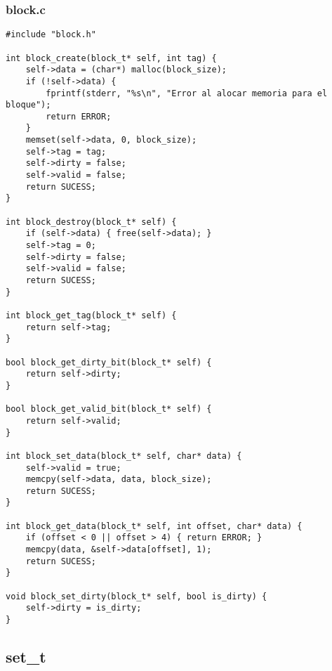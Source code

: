 \documentclass[a4paper,10pt]{article}
\begin{document}
 \subsubsection{block.c}
 \begin{verbatim}
#include "block.h"

int block_create(block_t* self, int tag) {
	self->data = (char*) malloc(block_size);
	if (!self->data) {
		fprintf(stderr, "%s\n", "Error al alocar memoria para el bloque");
		return ERROR;
	}
	memset(self->data, 0, block_size);
	self->tag = tag;
	self->dirty = false;
	self->valid = false;
	return SUCESS;
}

int block_destroy(block_t* self) {
	if (self->data) { free(self->data); }
	self->tag = 0;
	self->dirty = false;
	self->valid = false;
	return SUCESS;
}

int block_get_tag(block_t* self) {
	return self->tag;
}

bool block_get_dirty_bit(block_t* self) {
	return self->dirty;
}

bool block_get_valid_bit(block_t* self) {
	return self->valid;
}

int block_set_data(block_t* self, char* data) {
	self->valid = true;
	memcpy(self->data, data, block_size);
	return SUCESS;
}

int block_get_data(block_t* self, int offset, char* data) {
	if (offset < 0 || offset > 4) { return ERROR; }
	memcpy(data, &self->data[offset], 1);
	return SUCESS;
}

void block_set_dirty(block_t* self, bool is_dirty) {
	self->dirty = is_dirty;
}

 \end{verbatim}
  
  \subsection{set\_t}
\end{document}
